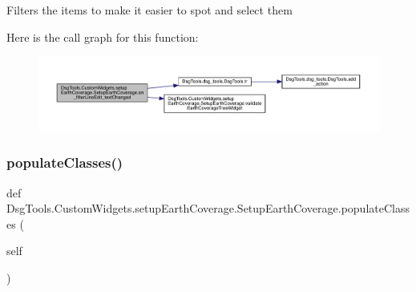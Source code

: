\begin{DoxyVerb}Filters the items to make it easier to spot and select them
\end{DoxyVerb}
 Here is the call graph for this function\+:
\nopagebreak
\begin{figure}[H]
\begin{center}
\leavevmode
\includegraphics[width=350pt]{class_dsg_tools_1_1_custom_widgets_1_1setup_earth_coverage_1_1_setup_earth_coverage_adb1b963355713749fd85b3a84443b1f4_cgraph}
\end{center}
\end{figure}
\mbox{\label{class_dsg_tools_1_1_custom_widgets_1_1setup_earth_coverage_1_1_setup_earth_coverage_a164b8e379820f6c2def0c0e8efbb4e08}} 
\subsubsection{\texorpdfstring{populate\+Classes()}{populateClasses()}}
{\footnotesize\ttfamily def Dsg\+Tools.\+Custom\+Widgets.\+setup\+Earth\+Coverage.\+Setup\+Earth\+Coverage.\+populate\+Classes (\begin{DoxyParamCaption}\item[{}]{self }\end{DoxyParamCaption})}

